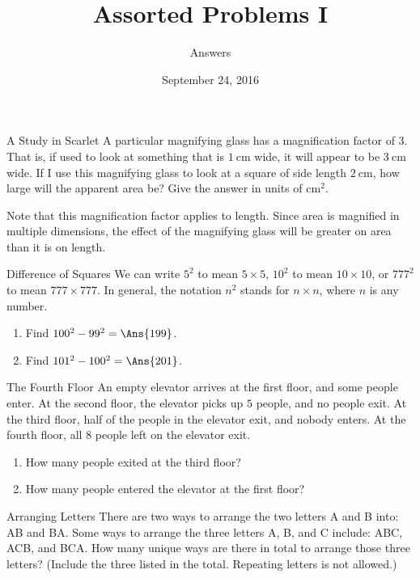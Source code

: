 \documentclass[14pt,letterpaper]{article}
\title{Assorted Problems I}
\author{Answers}
\date{September 24, 2016}
\begin{document}
\HomeworkTitle

\thispagestyle{empty}

\begin{problem}{A Study in Scarlet}
 A particular magnifying glass has a magnification factor of $3$. That is, if
 used to look at something that is $\SI{1}{\centi\metre}$ wide, it will appear
 to be $\SI{3}{\centi\metre}$ wide. If I use this magnifying glass to look at a
 square of side length $\SI{2}{\centi\metre}$, how large will the apparent area
 be? Give the answer in units of $\si{\centi\metre\squared}$.

 Note that this magnification factor applies to length. Since area is magnified
 in multiple dimensions, the effect of the magnifying glass will be greater on
 area than it is on length. 
\end{problem}

\begin{problem}{Difference of Squares}
 We can write $5^2$ to mean $5\times5$, $10^2$ to mean $10\times10$, or $777^2$
 to mean $777\times777$. In general, the notation $n^2$ stands for $n\times n$,
 where $n$ is any number.

 \begin{enumerate}[\hspace{1cm}a.]
  \item Find $100^2 - 99^2 = \Ans{199}$.
  \item Find $101^2 - 100^2 = \Ans{201}$.
 \end{enumerate}
\end{problem}

\begin{problem}{The Fourth Floor}
 An empty elevator arrives at the first floor, and some people enter. At the
 second floor, the elevator picks up $5$ people, and no people exit. At the
 third floor, half of the people in the elevator exit, and nobody enters. At the
 fourth floor, all $8$ people left on the elevator exit.

 \begin{enumerate}[\hspace{1cm}a.]
  \item How many people exited at the third floor? 
  \item How many people entered the elevator at the first floor? 
 \end{enumerate}
\end{problem}

\begin{problem}{Arranging Letters}
 There are two ways to arrange the two letters A and B into: AB and BA. Some
 ways to arrange the three letters A, B, and C include: ABC, ACB, and BCA. How
 many unique ways are there in total to arrange those three letters? (Include
 the three listed in the total. Repeating letters is not allowed.) 
\end{problem}
\end{document}
